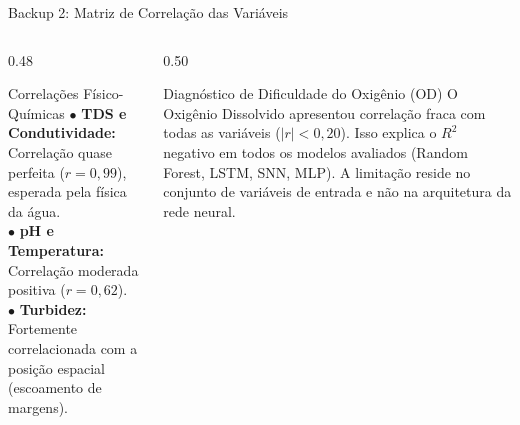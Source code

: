 \documentclass[aspectratio=169,10pt]{beamer}
\begin{document}
\begin{frame}{Backup 2: Matriz de Correlação das Variáveis}
  \begin{columns}[T,onlytextwidth]
    \begin{column}{0.48\linewidth}
      \begin{block}{Correlações Físico-Químicas}
        \scriptsize
        $\bullet$ \textbf{TDS e Condutividade:} Correlação quase perfeita ($r = 0{,}99$), esperada pela física da água.\\
        $\bullet$ \textbf{pH e Temperatura:} Correlação moderada positiva ($r = 0{,}62$).\\
        $\bullet$ \textbf{Turbidez:} Fortemente correlacionada com a posição espacial (escoamento de margens).
      \end{block}
    \end{column}

    \begin{column}{0.50\linewidth}
      \begin{alertblock}{Diagnóstico de Dificuldade do Oxigênio (OD)}
        \scriptsize
        O Oxigênio Dissolvido apresentou correlação fraca com todas as variáveis ($|r| < 0{,}20$). Isso explica o $R^2$ negativo em todos os modelos avaliados (Random Forest, LSTM, SNN, MLP). A limitação reside no conjunto de variáveis de entrada e não na arquitetura da rede neural.
      \end{alertblock}
    \end{column}
  \end{columns}
\end{frame}
\end{document}
